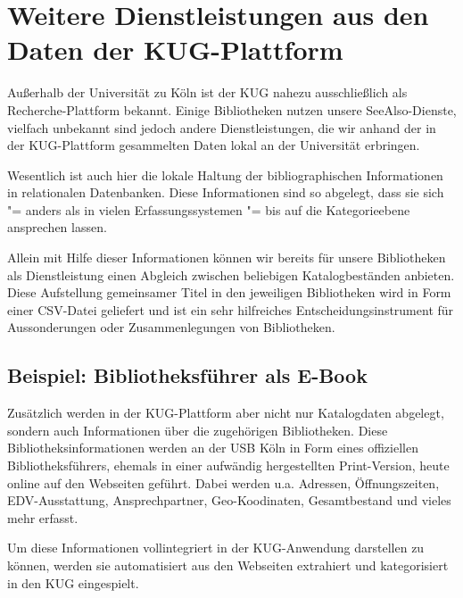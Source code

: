 \documentclass[11pt]{scrartcl}
\begin{document}
\section{Weitere Dienstleistungen aus den Daten der KUG-Plattform}

Außerhalb der Universität zu Köln ist der KUG nahezu ausschließlich
als Recherche-Plattform bekannt. Einige Bibliotheken nutzen unsere
SeeAlso-Dienste, vielfach unbekannt sind jedoch andere
Dienstleistungen, die wir anhand der in der KUG-Plattform gesammelten
Daten lokal an der Universität erbringen.

Wesentlich ist auch hier die lokale Haltung der bibliographischen
Informationen in relationalen Datenbanken. Diese Informationen sind so
abgelegt, dass sie sich "= anders als in vielen Erfassungssystemen "=
bis auf die Kategorieebene ansprechen lassen.

Allein mit Hilfe dieser Informationen können wir bereits für unsere
Bibliotheken als Dienstleistung einen Abgleich zwischen beliebigen
Katalogbeständen anbieten. Diese Aufstellung gemeinsamer Titel in den
jeweiligen Bibliotheken wird in Form einer CSV-Datei geliefert und ist
ein sehr hilfreiches Entscheidungsinstrument für Aussonderungen oder
Zusammenlegungen von Bibliotheken.

\subsection{Beispiel: Bibliotheksführer als E-Book}

Zusätzlich werden in der KUG-Plattform aber nicht nur Katalogdaten
abgelegt, sondern auch Informationen über die zugehörigen
Bibliotheken. Diese Bibliotheksinformationen werden an der USB Köln in
Form eines offiziellen Bibliotheksführers, ehemals in einer aufwändig
hergestellten Print-Version, heute online auf den Webseiten geführt.
Dabei werden u.a. Adressen, Öffnungszeiten, EDV-Ausstattung,
Ansprechpartner, Geo-Koodinaten, Gesamtbestand und vieles mehr
erfasst.

Um diese Informationen vollintegriert in der  KUG-Anwendung
darstellen zu können, werden sie automatisiert aus den Webseiten
extrahiert und kategorisiert in den KUG eingespielt.
\end{document}
